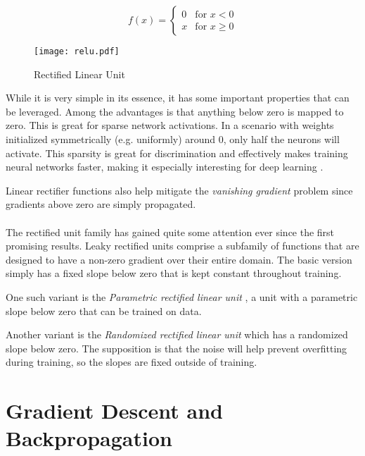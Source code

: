 \begin{equation}
\label{eq.relu}
f(x) =
\begin{cases}
0 & \text{for } x < 0 \\
x & \text{for } x \geq 0
\end{cases}
\end{equation}

\begin{figure}[h]
\center
\texttt{[image: relu.pdf]}
\caption{Rectified Linear Unit}
\label{fig.ml.relu}
\end{figure}

While it is very simple in its essence,
it has some important properties
that can be leveraged.
Among the advantages is that anything
below zero is mapped to zero.
This is great for sparse
network activations.
In a scenario with weights initialized
symmetrically (e.g. uniformly) around 0,
only half the neurons will activate.
This sparsity is great for discrimination
and effectively makes training
neural networks faster,
making it especially interesting for
deep learning
\parencite{Y.2015a}.

Linear rectifier functions also help mitigate
the \textit{vanishing gradient} problem %
since gradients above zero
are simply propagated.

\paragraph{}
The rectified unit family has gained quite some attention
ever since the first promising results.
Leaky rectified units comprise a subfamily
of functions that are designed to have a non-zero
gradient over their entire domain.
The basic version simply
has a fixed slope below zero
that is kept constant throughout training.

One such variant is the
\textit{Parametric rectified linear unit}
\parencite{He2015a},
a unit with a parametric slope below zero
that can be trained on data.

Another variant is the
\textit{Randomized rectified linear unit}
which has a randomized slope below zero.
The supposition is that the noise
will help prevent overfitting during training,
so the slopes are fixed outside of training.


\section{Gradient Descent and Backpropagation}
